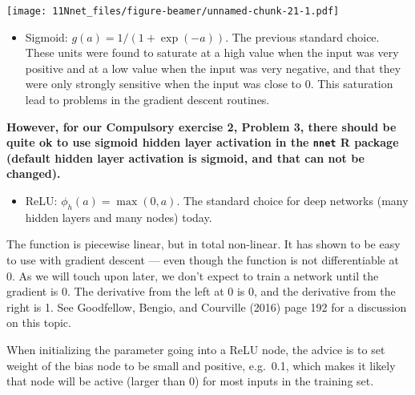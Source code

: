 \documentclass[10pt,ignorenonframetext,]{beamer}
\providecommand{\tightlist}{%
  \setlength{\itemsep}{0pt}\setlength{\parskip}{0pt}}
\begin{document}
\begin{frame}

\texttt{[image: 11Nnet\_files/figure-beamer/unnamed-chunk-21-1.pdf]}

\end{frame}

\begin{frame}[fragile]

\begin{itemize}
\tightlist
\item
  Sigmoid: \(g(a)=1/(1+\exp(-a))\). The previous standard choice. These
  units were found to saturate at a high value when the input was very
  positive and at a low value when the input was very negative, and that
  they were only strongly sensitive when the input was close to 0. This
  saturation lead to problems in the gradient descent routines.
\end{itemize}

\textbf{However, for our Compulsory exercise 2, Problem 3, there should
be quite ok to use sigmoid hidden layer activation in the \texttt{nnet}
R package (default hidden layer activation is sigmoid, and that can not
be changed).}

\end{frame}

\begin{frame}

\begin{itemize}
\tightlist
\item
  ReLU: \(\phi_h(a)=\max(0,a)\). The standard choice for deep networks
  (many hidden layers and many nodes) today.
\end{itemize}

The function is piecewise linear, but in total non-linear. It has shown
to be easy to use with gradient descent --- even though the function is
not differentiable at 0. As we will touch upon later, we don't expect to
train a network until the gradient is 0. The derivative from the left at
0 is 0, and the derivative from the right is 1. See Goodfellow, Bengio,
and Courville (2016) page 192 for a discussion on this topic.

When initializing the parameter going into a ReLU node, the advice is to
set weight of the bias node to be small and positive, e.g.~0.1, which
makes it likely that node will be active (larger than 0) for most inputs
in the training set.

\end{frame}
\end{document}

